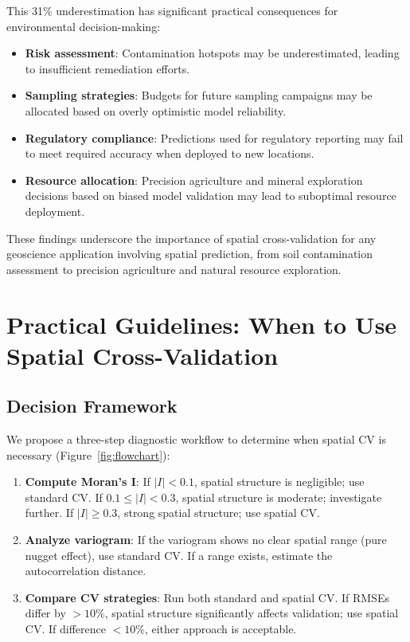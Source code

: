 \documentclass[review,12pt]{elsarticle}
\begin{document}
This 31\% underestimation has significant practical consequences for environmental decision-making:

\begin{itemize}
\item \textbf{Risk assessment}: Contamination hotspots may be underestimated, leading to insufficient remediation efforts.
\item \textbf{Sampling strategies}: Budgets for future sampling campaigns may be allocated based on overly optimistic model reliability.
\item \textbf{Regulatory compliance}: Predictions used for regulatory reporting may fail to meet required accuracy when deployed to new locations.
\item \textbf{Resource allocation}: Precision agriculture and mineral exploration decisions based on biased model validation may lead to suboptimal resource deployment.
\end{itemize}

These findings underscore the importance of spatial cross-validation for any geoscience application involving spatial prediction, from soil contamination assessment to precision agriculture and natural resource exploration.


\section{Practical Guidelines: When to Use Spatial Cross-Validation}\label{sec:guidelines}

\subsection{Decision Framework}

We propose a three-step diagnostic workflow to determine when spatial CV is necessary (Figure~\ref{fig:flowchart}):

\begin{enumerate}
\item \textbf{Compute Moran's I}: If $|I| < 0.1$, spatial structure is negligible; use standard CV. If $0.1 \leq |I| < 0.3$, spatial structure is moderate; investigate further. If $|I| \geq 0.3$, strong spatial structure; use spatial CV.

\item \textbf{Analyze variogram}: If the variogram shows no clear spatial range (pure nugget effect), use standard CV. If a range exists, estimate the autocorrelation distance.

\item \textbf{Compare CV strategies}: Run both standard and spatial CV. If RMSEs differ by $>10\%$, spatial structure significantly affects validation; use spatial CV. If difference $<10\%$, either approach is acceptable.
\end{enumerate}
\end{document}
